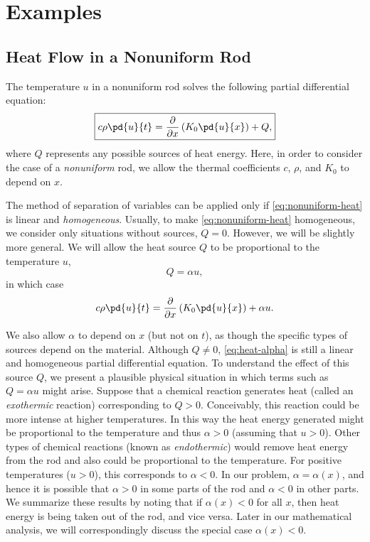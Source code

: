 \section{Examples}
\label{sec:sl-examples}

\subsection{Heat Flow in a Nonuniform Rod}
\label{subsec:nonuniform-rod}

The temperature $u$ in a nonuniform rod solves the following partial differential equation:
\begin{equation}
\label{eq:nonuniform-heat}
\boxed{c\rho\pd{u}{t} = \frac{\partial}{\partial x}\left(K_0\pd{u}{x}\right) + Q,}
\end{equation}
where $Q$ represents any possible sources of heat energy.  Here, in order to consider the case of a \textit{nonuniform} rod, we allow the thermal coefficients $c$, $\rho$, and $K_0$ to depend on $x$.

The method of separation of variables can be applied only if \eqref{eq:nonuniform-heat} is linear and \textit{homogeneous}.  Usually, to make \eqref{eq:nonuniform-heat} homogeneous, we consider only situations without sources, $Q = 0$.  However, we will be slightly more general.  We will allow the heat source $Q$ to be proportional to the temperature $u$,
\begin{equation}
\label{eq:Q-alpha-u}
\boxed{Q = \alpha u,}
\end{equation}
in which case
\begin{equation}
\label{eq:heat-alpha}
c\rho\pd{u}{t} = \frac{\partial}{\partial x}\left(K_0\pd{u}{x}\right) + \alpha u.
\end{equation}

We also allow $\alpha$ to depend on $x$ (but not on $t$), as though the specific types of sources depend on the material.  Although $Q \neq 0$, \eqref{eq:heat-alpha} is still a linear and homogeneous partial differential equation.  To understand the effect of this source $Q$, we present a plausible physical situation in which terms such as $Q = \alpha u$ might arise.  Suppose that a chemical reaction generates heat (called an \textit{exothermic} reaction) corresponding to $Q > 0$.  Conceivably, this reaction could be more intense at higher temperatures.  In this way the heat energy generated might be proportional to the temperature and thus $\alpha > 0$ (assuming that $u > 0$).  Other types of chemical reactions (known as \textit{endothermic}) would remove heat energy from the rod and also could be proportional to the temperature.  For positive temperatures ($u > 0$), this corresponds to $\alpha < 0$.  In our problem, $\alpha = \alpha(x)$, and hence it is possible that $\alpha > 0$ in some parts of the rod and $\alpha < 0$ in other parts.  We summarize these results by noting that if $\alpha(x) < 0$ for all $x$, then heat energy is being taken out of the rod, and vice versa.  Later in our mathematical analysis, we will correspondingly discuss the special case $\alpha(x) < 0$.

